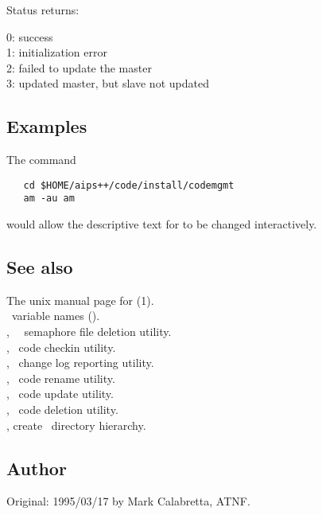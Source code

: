 Status returns:
\begin{status}
   0: success\\
   1: initialization error\\
   2: failed to update the master\\
   3: updated master, but slave not updated
\end{status}

\subsection*{Examples}

The command

\begin{verbatim}
   cd $HOME/aips++/code/install/codemgmt
   am -au am
\end{verbatim}

\noindent
would allow the descriptive text for  to be changed interactively.

\subsection*{See also}

The unix manual page for (1).\\
\aipspp\ variable names ().\\
, \aipspp\ \rcs\ semaphore file deletion utility.\\
, \aipspp\ code checkin utility.\\
, \aipspp\ change log reporting utility.\\
, \aipspp\ code rename utility.\\
, \aipspp\ code update utility.\\
, \aipspp\ code deletion utility.\\
, create \aipspp\ directory hierarchy.

\subsection*{Author}

Original: 1995/03/17 by Mark Calabretta, ATNF.


\newpage
\section{}
\label{amv}

